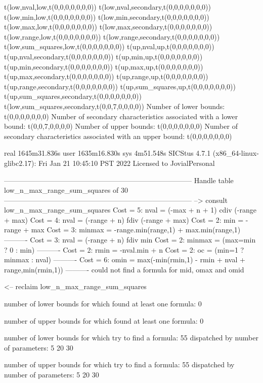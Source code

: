 t(low,nval,low,t(0,0,0,0,0,0,0))
t(low,nval,secondary,t(0,0,0,0,0,0,0))
t(low,min,low,t(0,0,0,0,0,0,0))
t(low,min,secondary,t(0,0,0,0,0,0,0))
t(low,max,low,t(0,0,0,0,0,0,0))
t(low,max,secondary,t(0,0,0,0,0,0,0))
t(low,range,low,t(0,0,0,0,0,0,0))
t(low,range,secondary,t(0,0,0,0,0,0,0))
t(low,sum_squares,low,t(0,0,0,0,0,0,0))
t(up,nval,up,t(0,0,0,0,0,0,0))
t(up,nval,secondary,t(0,0,0,0,0,0,0))
t(up,min,up,t(0,0,0,0,0,0,0))
t(up,min,secondary,t(0,0,0,0,0,0,0))
t(up,max,up,t(0,0,0,0,0,0,0))
t(up,max,secondary,t(0,0,0,0,0,0,0))
t(up,range,up,t(0,0,0,0,0,0,0))
t(up,range,secondary,t(0,0,0,0,0,0,0))
t(up,sum_squares,up,t(0,0,0,0,0,0,0))
t(up,sum_squares,secondary,t(0,0,0,0,0,0,0))
t(low,sum_squares,secondary,t(0,0,7,0,0,0,0))
Number of lower bounds:                                             t(0,0,0,0,0,0,0)
Number of secondary characteristics associated with a lower bound:  t(0,0,7,0,0,0,0)
Number of upper bounds:                                             t(0,0,0,0,0,0,0)
Number of secondary characteristics associated with an upper bound: t(0,0,0,0,0,0,0)

real	1645m31.836s
user	1635m16.830s
sys	4m51.548s
SICStus 4.7.1 (x86_64-linux-glibc2.17): Fri Jan 21 10:45:10 PST 2022
Licensed to JovialPersonal


--------------------------------------------------------------------------------
Handle table low_n_max_range_sum_squares of 30
--------------------------------------------------------------------------------
--> consult low_n_max_range_sum_squares
Cost =  5:  nval   = (-max + n + 1) cdiv (-range + max)
Cost =  4:  nval   = (-range + n) fdiv (-range + max)
Cost =  2:  min    = -range + max
Cost =  3:  minmax = -range.min(range,1) + max.min(range,1)
----------
Cost =  3:  nval   = (-range + n) fdiv min
Cost =  2:  minmax = (max=min ? 0 : min)
----------
Cost =  2:  rmin   = -nval.min + n
Cost =  2:  oc     = (min=1 ? minmax : nval)
----------
Cost =  6:  omin   = max(-min(rmin,1) - rmin + nval + range,min(rmin,1))
----------
could not find a formula for mid, omax and omid

<-- reclaim low_n_max_range_sum_squares

number of lower bounds for which found at least one formula: 0

number of upper bounds for which found at least one formula: 0

number of lower bounds for which try to find a formula: 55
dispatched by number of parameters: 5  20  30

number of upper bounds for which try to find a formula: 55
dispatched by number of parameters: 5  20  30

